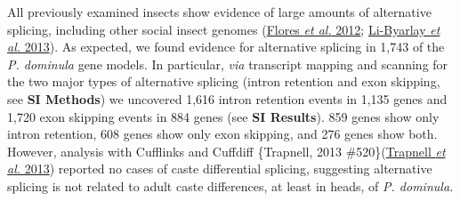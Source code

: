 \documentclass[]{article}
\begin{document}
All previously examined insects show evidence of large amounts of
alternative splicing, including other social insect genomes
(\protect\hyperlink{ux5fENREFux5f11}{Flores \emph{et al.} 2012};
\protect\hyperlink{ux5fENREFux5f32}{Li-Byarlay \emph{et al.} 2013}). As
expected, we found evidence for alternative splicing in 1,743 of the
\emph{P. dominula} gene models. In particular, \emph{via} transcript
mapping and scanning for the two major types of alternative splicing
(intron retention and exon skipping, see \textbf{SI Methods}) we
uncovered 1,616 intron retention events in 1,135 genes and 1,720 exon
skipping events in 884 genes (see \textbf{SI Results}). 859 genes show
only intron retention, 608 genes show only exon skipping, and 276 genes
show both. However, analysis with Cufflinks and Cuffdiff \{Trapnell,
2013 \#520\}(\protect\hyperlink{ux5fENREFux5f64}{Trapnell \emph{et al.}
2013}) reported no cases of caste differential splicing, suggesting
alternative splicing is not related to adult caste differences, at least
in heads, of \emph{P. dominula.}
\end{document}
